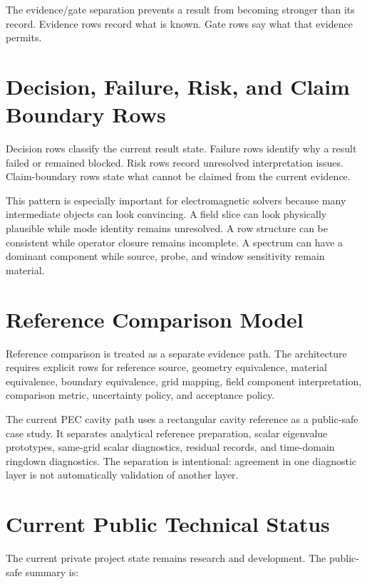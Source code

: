 \documentclass[11pt,a4paper]{article}
\begin{document}
The evidence/gate separation prevents a result from becoming stronger than its record. Evidence rows record what is known. Gate rows say what that evidence permits.

\section{Decision, Failure, Risk, and Claim Boundary Rows}

Decision rows classify the current result state. Failure rows identify why a result failed or remained blocked. Risk rows record unresolved interpretation issues. Claim-boundary rows state what cannot be claimed from the current evidence.

This pattern is especially important for electromagnetic solvers because many intermediate objects can look convincing. A field slice can look physically plausible while mode identity remains unresolved. A row structure can be consistent while operator closure remains incomplete. A spectrum can have a dominant component while source, probe, and window sensitivity remain material.

\section{Reference Comparison Model}

Reference comparison is treated as a separate evidence path. The architecture requires explicit rows for reference source, geometry equivalence, material equivalence, boundary equivalence, grid mapping, field component interpretation, comparison metric, uncertainty policy, and acceptance policy.

The current PEC cavity path uses a rectangular cavity reference as a public-safe case study. It separates analytical reference preparation, scalar eigenvalue prototypes, same-grid scalar diagnostics, residual records, and time-domain ringdown diagnostics. The separation is intentional: agreement in one diagnostic layer is not automatically validation of another layer.

\section{Current Public Technical Status}

The current private project state remains research and development. The public-safe summary is:
\end{document}
